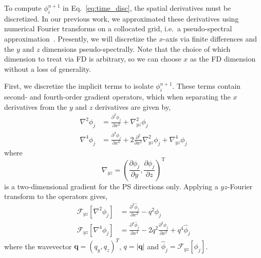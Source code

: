\documentclass[journal=mamobx,manuscript=suppinfo]{achemso}
\begin{document}
To compute $\phi_{i}^{n+1}$ in Eq.~\ref{eq:time_disc}, the spatial derivatives must be discretized.
In our previous work, we approximated these derivatives using numerical Fourier transforms on a collocated grid, i.e.\ a pseudo-spectral approximation~\cite{Tree2017,Fredrickson2006}.
Presently, we will discretize the $x$-axis via finite differences and the $y$ and $z$ dimensions pseudo-spectrally.
Note that the choice of which dimension to treat via FD is arbitrary, so we can choose $x$ as the FD dimension without a loss of generality.

First, we discretize the implicit terms to isolate $\phi_{i}^{n+1}$. 
These terms contain second- and fourth-order gradient operators, which when separating the $x$ derivatives from the $y$ and $z$ derivatives are given by,
\begin{align}
  \nabla^{2} \phi_{j} &= \frac{\partial^2 \phi_{j}}{\partial x^2} + \nabla^{2}_{yz} \phi_{j} \\
  \nabla^{4} \phi_{j} & = \frac{\partial^{4} \phi_{j}}{\partial x^{4}} 
    + 2 \frac{\partial^{2}}{\partial x^{2}} \nabla^{2}_{yz} \phi_{j}
    + \nabla^{4}_{yz} \phi_{j}
\end{align}
where 
\begin{equation}
\nabla_{yz} = \left( \frac{\partial \phi_{j}}{\partial y}, \frac{\partial \phi_{j}}{\partial z} \right )^{\mathrm{T}}
\end{equation}
is a two-dimensional gradient for the PS directions only.
Applying a $yz$-Fourier transform to the operators gives,
\begin{align}
  \mathcal{F}_{yz}[\nabla^{2} \phi_{j}] &= \frac{\partial^2 \hat{\phi}_{j}}{\partial x^2} 
    - q^{2} \hat{\phi}_{j}  \label{eq:d2} \\
  \mathcal{F}_{yz}[\nabla^{4} \phi_{j}] & = \frac{\partial^{4} \hat{\phi}_{j}}{\partial x^{4}} 
    - 2 q^{2} \frac{\partial^{2} \hat{\phi}_{j}}{\partial x^{2}}
    + q^{4} \hat{\phi}_{j} \label{eq:d4} 
\end{align}
where the wavevector $\bm{q} = (q_{y}, q_{z})^{T}$, $q = |\bm{q}|$ and $\hat{\phi}_{j} = \mathcal{F}_{yz}[\phi_{j}]$.
\end{document}
